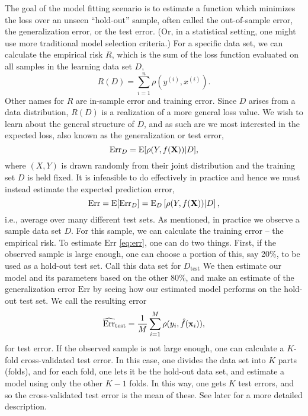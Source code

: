 The goal of the model fitting scenario is to estimate a function which minimizes the loss over an unseen ``hold-out'' sample, often called the out-of-sample error, the generalization error, or the test error. (Or, in a statistical setting, one might use more traditional model selection criteria.) For a specific data set, we can calculate the empirical risk $R$, which is the sum of the loss function evaluated on all samples in the learning data set $D$,
\begin{equation}\label{eq:empirical-risk-2}
    R(D)=\sum_{i=1}^n\rho(y^{(i)},x^{(i)}).
\end{equation}
Other names for $R$ are in-sample error and training error. Since $D$ arises from a data distribution, $R(D)$ is a realization of a more general loss value. We wish to learn about the general structure of $D$, and as such are we most interested in the expected loss, also known as the generalization or test error,
\begin{equation*}
    \text{Err}_{D}=\operatorname{E}[\rho(Y,f(\mathbf{X}))|D],
\end{equation*}
where $(X,Y)$ is drawn randomly from their joint distribution and the training set $D$ is held fixed. It is infeasible to do effectively in practice
and hence we must instead estimate the expected prediction error,
\begin{equation}\label{eq:err}
    \text{Err}=\operatorname{E}[\text{Err}_D]=\operatorname{E}_D\left[\rho(Y,f(\mathbf{X}))|D\right],
\end{equation}
i.e., average over many different test sets. As mentioned, in practice we observe a sample data set $D$. For this sample, we can calculate the training error -- the empirical risk. To estimate $\text{Err}$ \eqref{eq:err}, one can do two things. First, if the observed sample is large enough, one can choose a portion of this, say 20\%, to be used as a hold-out test set. Call this data set for $D_{\text{test}}$ We then estimate our model and its parameters based on the other 80\%, and make an estimate of the generalization error $\text{Err}$ by seeing how our estimated model performs on the hold-out test set. We call the resulting error
\begin{equation*}
    \widehat{\text{Err}}_{\text{test}}=\frac{1}{M}\sum_{i=1}^M \rho(y_i,\hat{f}(\mathbf{x}_i)),
\end{equation*}
for test error. If the observed sample is not large enough, one can calculate a $K$-fold cross-validated test error. In this case, one divides the data set into $K$ parts (folds), and for each fold, one lets it be the hold-out data set, and estimate a model using only the other $K-1$ folds. In this way, one gets $K$ test errors, and so the cross-validated test error is the mean of these. See later for a more detailed description.

